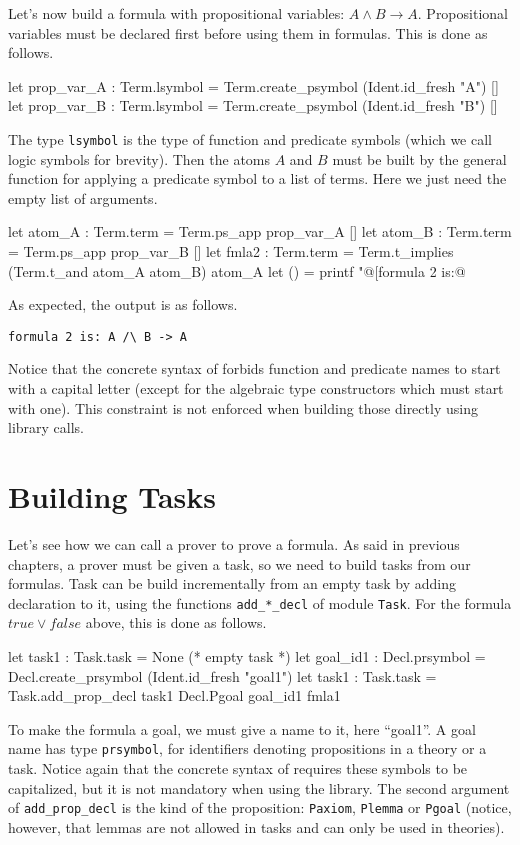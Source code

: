 Let's now build a formula with propositional variables: $A \land B
\rightarrow A$. Propositional variables must be declared first before
using them in formulas. This is done as follows.
\begin{ocamlcode}
let prop_var_A : Term.lsymbol =
  Term.create_psymbol (Ident.id_fresh "A") []
let prop_var_B : Term.lsymbol =
  Term.create_psymbol (Ident.id_fresh "B") []
\end{ocamlcode}
The type \texttt{lsymbol} is the type of function and predicate symbols (which
we call logic symbols for brevity). Then the atoms $A$ and $B$ must be built
by the general function for applying a predicate symbol to a list of terms.
Here we just need the empty list of arguments.
\begin{ocamlcode}
let atom_A : Term.term = Term.ps_app prop_var_A []
let atom_B : Term.term = Term.ps_app prop_var_B []
let fmla2 : Term.term =
  Term.t_implies (Term.t_and atom_A atom_B) atom_A
let () = printf "@[formula 2 is:@ %
\end{ocamlcode}

As expected, the output is as follows.
\begin{verbatim}
formula 2 is: A /\ B -> A
\end{verbatim}
Notice that the concrete syntax of \why forbids function and predicate
names to start with a capital letter (except for the algebraic type
constructors which must start with one). This constraint is not enforced
when building those directly using library calls.

\section{Building Tasks}

Let's see how we can call a prover to prove a formula. As said in
previous chapters, a prover must be given a task, so we need to build
tasks from our formulas. Task can be build incrementally from an empty
task by adding declaration to it, using the functions
\texttt{add\_*\_decl} of module \texttt{Task}. For the formula $true \lor
false$ above, this is done as follows.
\begin{ocamlcode}
let task1 : Task.task = None (* empty task *)
let goal_id1 : Decl.prsymbol =
  Decl.create_prsymbol (Ident.id_fresh "goal1")
let task1 : Task.task =
  Task.add_prop_decl task1 Decl.Pgoal goal_id1 fmla1
\end{ocamlcode}
To make the formula a goal, we must give a name to it, here ``goal1''. A
goal name has type \texttt{prsymbol}, for identifiers denoting
propositions in a theory or a task. Notice again that the concrete
syntax of \why requires these symbols to be capitalized, but it is not
mandatory when using the library. The second argument of
\texttt{add\_prop\_decl} is the kind of the proposition:
\texttt{Paxiom}, \texttt{Plemma} or \texttt{Pgoal}
(notice, however, that lemmas are not allowed in tasks
and can only be used in theories).


